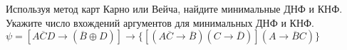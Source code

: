 \question Используя метод карт Карно или Вейча, найдите минимальные ДНФ и КНФ. Укажите число вхождений аргументов для минимальных ДНФ и КНФ.
$\psi = [A\overline{C}D \rightarrow (\overline{B} \oplus D)] \rightarrow \{[(A\overline{C} \rightarrow \overline{B})(C \rightarrow \overline{D})](A \rightarrow \overline{B}C)\}$